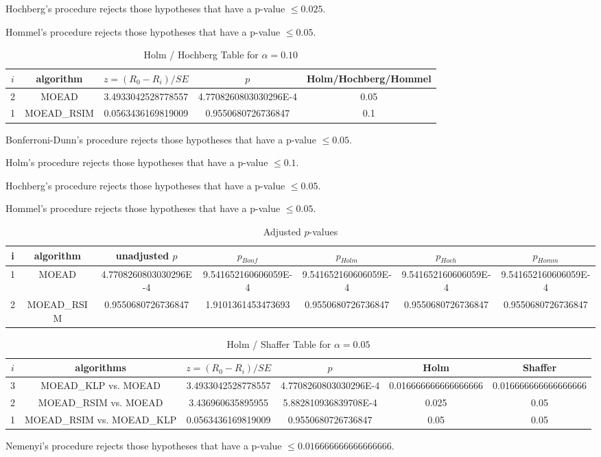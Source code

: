 \documentclass[a4paper,10pt]{article}
\begin{document}
\begin{landscape}
Hochberg's procedure rejects those hypotheses that have a p-value $\le0.025$.


Hommel's procedure rejects those hypotheses that have a p-value $\le0.05$.


\begin{table}[!htp]
\centering\tiny
\caption{Holm / Hochberg Table for $\alpha=0.10$}
\begin{tabular}{ccccc}
$i$&algorithm&$z=(R_0 - R_i)/SE$&$p$&Holm/Hochberg/Hommel\\
\hline
2&MOEAD&3.4933042528778557&4.7708260803030296E-4&0.05\\
1&MOEAD_RSIM&0.0563436169819009&0.9550680726736847&0.1\\
\hline
\end{tabular}
\end{table}
Bonferroni-Dunn's procedure rejects those hypotheses that have a p-value $\le0.05$.


Holm's procedure rejects those hypotheses that have a p-value $\le0.1$.


Hochberg's procedure rejects those hypotheses that have a p-value $\le0.05$.


Hommel's procedure rejects those hypotheses that have a p-value $\le0.05$.


\begin{table}[!htp]
\centering\tiny
\caption{Adjusted $p$-values}
\begin{tabular}{ccccccc}
i&algorithm&unadjusted $p$&$p_{Bonf}$&$p_{Holm}$&$p_{Hoch}$&$p_{Homm}$\\
\hline
1&MOEAD&4.7708260803030296E-4&9.541652160606059E-4&9.541652160606059E-4&9.541652160606059E-4&9.541652160606059E-4\\
2&MOEAD_RSIM&0.9550680726736847&1.9101361453473693&0.9550680726736847&0.9550680726736847&0.9550680726736847\\
\hline
\end{tabular}
\end{table}

\begin{table}[!htp]
\centering\tiny
\caption{Holm / Shaffer Table for $\alpha=0.05$}
\begin{tabular}{cccccc}
$i$&algorithms&$z=(R_0 - R_i)/SE$&$p$&Holm&Shaffer\\
\hline
3&MOEAD_KLP vs. MOEAD&3.4933042528778557&4.7708260803030296E-4&0.016666666666666666&0.016666666666666666\\
2&MOEAD_RSIM vs. MOEAD&3.436960635895955&5.882810936839708E-4&0.025&0.05\\
1&MOEAD_RSIM vs. MOEAD_KLP&0.0563436169819009&0.9550680726736847&0.05&0.05\\
\hline
\end{tabular}
\end{table}
Nemenyi's procedure rejects those hypotheses that have a p-value $\le0.016666666666666666$.



\end{landscape}
\end{document}
